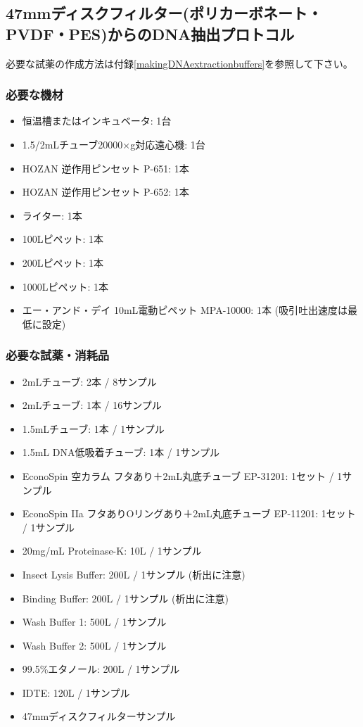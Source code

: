\documentclass[titlepage,10pt,a4paper,uplatex]{jsbook}
\begin{document}
\subsection{47mmディスクフィルター(ポリカーボネート・PVDF・PES)からのDNA抽出プロトコル}

必要な試薬の作成方法は付録\ref{makingDNAextractionbuffers}を参照して下さい。

\subsubsection{必要な機材}
\begin{itemize}
\item 恒温槽またはインキュベータ: 1台
\item 1.5/2mLチューブ20000×g対応遠心機: 1台
\item HOZAN 逆作用ピンセット P-651: 1本
\item HOZAN 逆作用ピンセット P-652: 1本
\item ライター: 1本
\item 100{\textmu}Lピペット: 1本
\item 200{\textmu}Lピペット: 1本
\item 1000{\textmu}Lピペット: 1本
\item エー・アンド・デイ 10mL電動ピペット MPA-10000: 1本 (吸引吐出速度は最低に設定)
\end{itemize}

\subsubsection{必要な試薬・消耗品}
\begin{itemize}
\item 2mLチューブ: 2本 / 8サンプル
\item 2mLチューブ: 1本 / 16サンプル
\item 1.5mLチューブ: 1本 / 1サンプル
\item 1.5mL DNA低吸着チューブ: 1本 / 1サンプル
\item EconoSpin 空カラム フタあり＋2mL丸底チューブ EP-31201: 1セット / 1サンプル
\item EconoSpin IIa フタありOリングあり＋2mL丸底チューブ EP-11201: 1セット / 1サンプル
\item 20mg/mL Proteinase-K: 10{\textmu}L / 1サンプル
\item Insect Lysis Buffer: 200{\textmu}L / 1サンプル (析出に注意)
\item Binding Buffer: 200{\textmu}L / 1サンプル (析出に注意)
\item Wash Buffer 1: 500{\textmu}L / 1サンプル
\item Wash Buffer 2: 500{\textmu}L / 1サンプル
\item 99.5\%エタノール: 200{\textmu}L / 1サンプル
\item IDTE: 120{\textmu}L / 1サンプル
\item 47mmディスクフィルターサンプル
\end{itemize}
\end{document}
